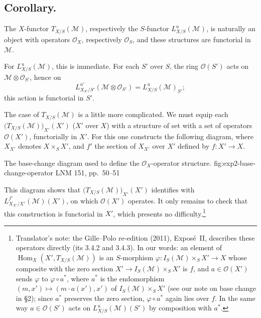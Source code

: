 \subsection*{Corollary.}
The \(X\)-functor \(T_{X/S}(\mathcal M)\), respectively the \(S\)-functor
\(L^u_{X/S}(\mathcal M)\), is naturally an object with operators
\(\mathcal O_X\), respectively \(\mathcal O_S\), and these structures
are functorial in \(\mathcal M\).

For \(L^u_{X/S}(\mathcal M)\), this is immediate. For each \(S'\) over
\(S\), the ring \(\mathcal O(S')\) acts on
\(\mathcal M\otimes\mathcal O_{S'}\), hence on
\[
  L^{u'}_{X_{S'}/S'}(\mathcal M\otimes\mathcal O_{S'})
  =L^u_{X/S}(\mathcal M)_{S'};
\]
this action is functorial in \(S'\).

The case of \(T_{X/S}(\mathcal M)\) is a little more complicated. We must
equip each \(\bigl(T_{X/S}(\mathcal M)\bigr)_{X'}(X')\) (\(X'\) over \(X\))
with a structure of set with a set of operators \(\mathcal O(X')\),
functorially in \(X'\). For this one constructs the following diagram,
where \(X_{X'}\) denotes \(X\times_SX'\), and \(f'\) the section of
\(X_{X'}\) over \(X'\) defined by \(f:X'\to X\).

  {The base-change diagram used to define the \(\mathcal O_X\)-operator structure.}
  {fig:exp2-base-change-operator}
  {LNM 151, pp.~50--51}

This diagram shows that \(\bigl(T_{X/S}(\mathcal M)\bigr)_{X'}(X')\)
identifies with \(L^{f'}_{X_{X'}/X'}(\mathcal M)(X')\), on which
\(\mathcal O(X')\) operates. It only remains to check that this
construction is functorial in \(X'\), which presents no difficulty.\footnote{Translator's
note: the Gille--Polo re-edition (2011), Expos\'e~II, describes these
operators directly (its 3.4.2 and 3.4.3). In our words: an element of
\(\operatorname{Hom}_X(X',T_{X/S}(\mathcal M))\) is an \(S\)-morphism
\(\varphi\colon I_S(\mathcal M)\times_SX'\to X\) whose composite with the
zero section \(X'\to I_S(\mathcal M)\times_SX'\) is \(f\), and
\(a\in\mathcal O(X')\) sends \(\varphi\) to \(\varphi\circ a^*\), where
\(a^*\) is the endomorphism \((m,x')\mapsto(m\cdot a(x'),x')\) of
\(I_S(\mathcal M)\times_SX'\) (see our note on base change in \S2); since
\(a^*\) preserves the zero section, \(\varphi\circ a^*\) again lies over
\(f\). In the same way \(a\in\mathcal O(S')\) acts on
\(L^u_{X/S}(\mathcal M)(S')\) by composition with \(a^*\).}

